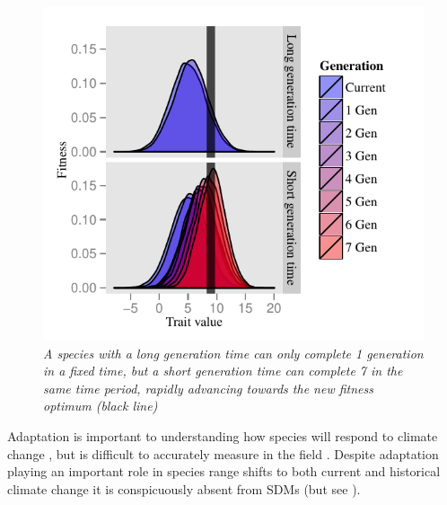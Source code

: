 \documentclass[pdftex,11pt,a4paper]{article}\usepackage{graphicx, color}
\makeatletter
\def\maxwidth{ %
  \ifdim\Gin@nat@width>\linewidth
    \linewidth
  \else
    \Gin@nat@width
  \fi
}
\newenvironment{knitrout}{}{} %
\makeatother
\begin{document}
\begin{figure}
\begin{knitrout}
\color{fgcolor}\includegraphics[width=\maxwidth]{figure/add_demo} 
\end{knitrout}

\caption{ \footnotesize{ \textit{A species with a long generation time can only complete 1 generation in a fixed time, but a short generation time can complete 7 in the same time period, rapidly advancing towards the new fitness optimum (black line)  }}\label{fig:add_demo}}
\end{figure}
Adaptation is important to understanding how species will respond to climate change \citep{Visser2008,lavergne2010biodiversity,Hoffmann2011}, but is difficult to accurately measure in the field \citep{Hansen2012}.
Despite adaptation playing an important role in species range shifts to both current \citep{Thomas2001,Bridle2007} and historical climate change \citep{Davis2001} it is conspicuously absent from SDMs \citep{Hoffman2011} (but see \citet{Kearney2009a}).  
\end{document}
